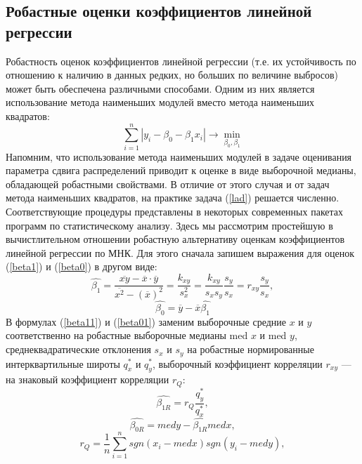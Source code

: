 \subsection{Робастные оценки коэффициентов линейной регрессии}
Робастность оценок коэффициентов линейной регрессии (т.е. их устойчивость по отношению к наличию в данных редких, но больших по величине выбросов) может быть обеспечена различными способами. Одним из них является использование метода наименьших модулей вместо метода наименьших квадратов:
\begin{equation} \label{lad}
\sum_{i=1}^{n}|y_i-\beta_0-\beta_1x_i|\rightarrow\min_{\beta_0, \beta_1}
\end{equation}
Напомним, что использование метода наименьших модулей в задаче оценивания параметра сдвига распределений приводит к оценке в виде выборочной медианы, обладающей робастными свойствами. В отличие от этого случая и от задач метода наименьших квадратов, на практике задача (\ref{lad}) решается численно. Соответствующие процедуры представлены в некоторых современных пакетах программ по статистическому анализу.
Здесь мы рассмотрим простейшую в вычистлительном отношении робастную альтернативу оценкам коэффициентов линейной регрессии по МНК. Для этого сначала запишем выражения для оценок (\ref{beta1}) и (\ref{beta0}) в другом виде:
\begin{equation} \label{beta11}
\widehat{\beta_1}=\frac{\overline{xy}-\overline{x}\cdot\overline{y}}{\overline{x^2}-(\overline{x})^2}=\frac{k_{xy}}{s_x^2}=\frac{k_{xy}}{s_x s_y} \frac{s_y}{s_x}=r_{xy}\frac{s_y}{s_x},
\end{equation}
\begin{equation} \label{beta01}
\widehat{\beta_0}=\overline{y}-\overline{x}\widehat{\beta_1}
\end{equation}
В формулах (\ref{beta11}) и (\ref{beta01}) заменим выборочные средние $x$ и $y$ соответственно на робастные выборочные медианы med $x$ и med $y$, среднеквадратические отклонения $s_x$ и $s_y$ на робастные нормированные интерквартильные широты $q_x^\ast$ и $q_y^\ast$, выборочный коэффициент корреляции $r_{xy}$ — на знаковый коэффициент корреляции $r_Q$:
\begin{equation}
\widehat{\beta_{1R}}=r_Q \frac{q_y^\ast}{q_x^\ast},
\end{equation}
\begin{equation}
\widehat{\beta_{0R}}=med y -\widehat{\beta_{1R}} med x ,
\end{equation}
\begin{equation}
r_Q=\frac{1}{n}\sum_{i=1}^{n}sgn(x_i-med x)sgn(y_i -med y),
\end{equation}
